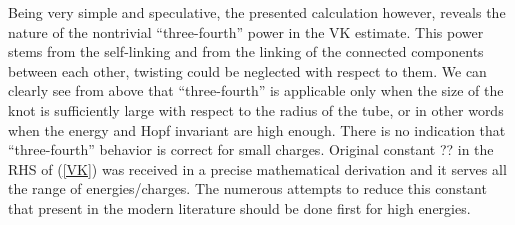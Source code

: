 \documentclass[a4paper,12pt]{article}
\begin{document}
	Being very simple and speculative, the presented calculation
	however, reveals the nature of the nontrivial ``three-fourth'' power
	in the VK estimate. This power stems from the self-linking 
	and from the linking of the connected components between
	each other, twisting could be neglected with respect to them.
	We can clearly see from above that ``three-fourth'' is 
	applicable only when the size of the knot is sufficiently
	large with respect to the radius of the tube, or in other
	words when the energy and Hopf invariant are high enough.
	There is no indication that ``three-fourth'' behavior is correct
	for small charges.
	Original constant ?? in the RHS of
(\ref{VK})
	was received in a precise mathematical derivation and it
	serves all the range of energies/charges.
	The numerous attempts to reduce this constant 
	that present in the modern literature should be done first for 
	high energies.

\end{document}
